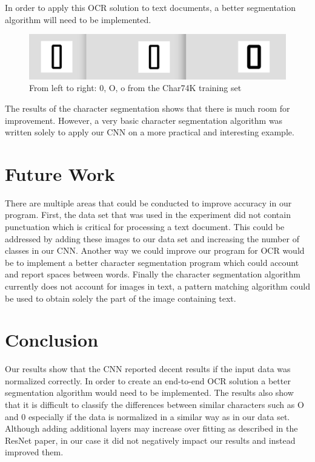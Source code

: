 \documentclass[11pt]{article}
\begin{document}
In order to apply this OCR solution to text documents, a better segmentation algorithm will need to be implemented.

\begin{figure}
    \centering
    \includegraphics[scale=0.4]{0Oo.png}
    \caption{From left to right: 0, O, o from the Char74K training set}
    \label{fig:0Oo}
\end{figure}

The results of the character segmentation shows that there is much room for improvement. However, a very basic character segmentation algorithm was written solely to apply our CNN on a more practical and interesting example.


\section{Future Work}

There are multiple areas that could be conducted to improve accuracy in our program. First, the data set that was used in the experiment did not contain punctuation which is critical for processing a text document. This could be addressed by adding these images to our data set and increasing the number of classes in our CNN. Another way we could improve our program for OCR would be to implement a better character segmentation program which could account and report spaces between words. Finally the character segmentation algorithm currently does not account for images in text, a pattern matching algorithm could be used to obtain solely the part of the image containing text.

\section{Conclusion}
Our results show that the CNN reported decent results if the input data was normalized correctly. In order to create an end-to-end OCR solution a better segmentation algorithm would need to be implemented. The results also show that it is difficult to classify the differences between similar characters such as O and 0 especially if the data is normalized in a similar way as in our data set. Although adding additional layers may increase over fitting as described in the ResNet paper, in our case it did not negatively impact our results and instead improved them. \cite{he2016deep}
\end{document}
